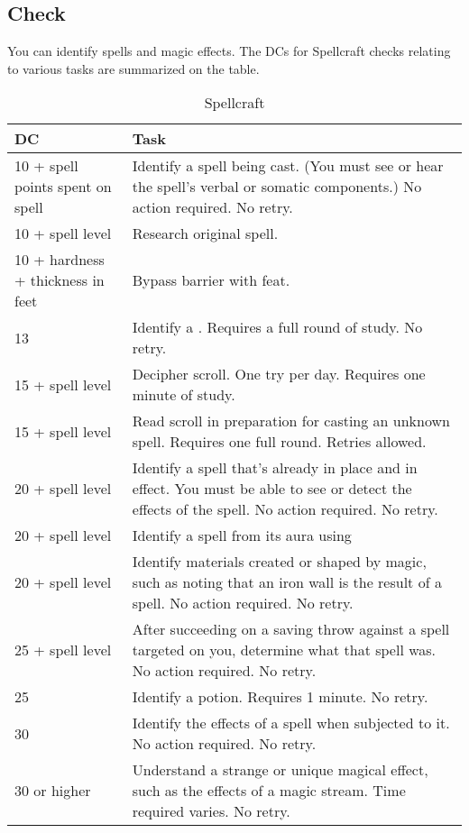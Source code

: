 \subsection{Check}
You can identify spells and magic effects. The DCs for Spellcraft checks relating to various tasks are summarized on the  table.
\begin{table*}
\centering
\caption{Spellcraft}
\label{tab:Spellcraft}
\begin{tabular}{p{}p{}}
\toprule
\textbf{DC}&\textbf{Task}\\
\midrule
10 + spell points spent on spell&Identify a spell being cast. (You must see or hear the spell's verbal or somatic components.) No action required. No retry.\\
10 + spell level&Research original spell.\\
10 + hardness + thickness in feet&Bypass barrier with \nameref{Feat:BurrowingSpell} feat.\\
13 &Identify a \nameref{Spell:GlyphOfWarding}. Requires a full round of study. No retry.\\
15 + spell level&Decipher scroll. One try per day. Requires one minute of study.\\
15 + spell level&Read scroll in preparation for casting an unknown spell. Requires one full round. Retries allowed.\\
20 + spell level&Identify a spell that's already in place and in effect. You must be able to see or detect the effects of the spell. No action required. No retry.\\
20 + spell level&Identify a spell from its aura using \nameref{Spell:DetectMagic}\\
20 + spell level&Identify materials created or shaped by magic, such as noting that an iron wall is the result of a \nameref{Spell:WallOfIron} spell. No action required. No retry.\\
25 + spell level&After succeeding on a saving throw against a spell targeted on you, determine what that spell was. No action required. No retry.\\
25 &Identify a potion. Requires 1 minute. No retry.\\
30 &Identify the effects of a \nameref{Spell:PlanarBinding} spell when subjected to it. No action required. No retry.\\
30 or higher&Understand a strange or unique magical effect, such as the effects of a magic stream. Time required varies. No retry.\\
\bottomrule
\end{tabular}
\normalsize
\end{table*}
